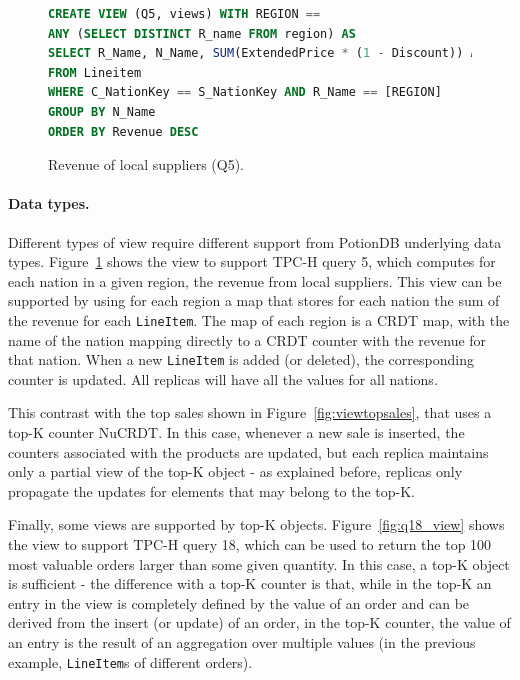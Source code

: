 \documentclass[sigplan,twocolumn,review,anonymous]{acmart}
\begin{document}
\begin{figure}[t]
\small{
\begin{lstlisting}[language=SQL]
CREATE VIEW (Q5, views) WITH REGION == 
ANY (SELECT DISTINCT R_name FROM region) AS
SELECT R_Name, N_Name, SUM(ExtendedPrice * (1 - Discount)) AS Revenue
FROM Lineitem
WHERE C_NationKey == S_NationKey AND R_Name == [REGION]
GROUP BY N_Name
ORDER BY Revenue DESC
\end{lstlisting}}
	\vspace{-5pt}
	\caption{Revenue of local suppliers (Q5).}
	\vspace{-10pt}
	\label{fig:viewlocalsupliers}
\end{figure}


\paragraph{Data types.} Different types of view require different support from PotionDB underlying data types.
Figure~\ref{fig:viewlocalsupliers} shows the view to support TPC-H query 5, which computes
for each nation in a given region, the revenue from local suppliers. 
This view can be supported by using for each region a map that stores for each nation the sum of the 
revenue for each \texttt{LineItem}. The map of each region is a CRDT map, with the name of the nation mapping
directly to a CRDT counter with the revenue for that nation. When a new \texttt{LineItem} is added (or deleted), 
the corresponding counter is updated. All replicas will have all the values for all nations.

This contrast with the top sales shown in Figure~\ref{fig:viewtopsales}, that uses a
top-K counter NuCRDT. In this case, whenever a new sale is inserted, the counters associated with the products are
updated, but each replica maintains only a partial view of the top-K object - as explained before, replicas only propagate 
the updates for elements that may belong to the top-K.

Finally,  some views are supported by top-K objects. Figure~\ref{fig:q18_view} shows the view to 
support TPC-H query 18, which can be used to return the top 100 most valuable orders larger than 
some given quantity.  In this case, a top-K object is sufficient - the difference with a top-K counter is that,
while in the top-K an entry in the view is completely defined by the value of an order and can be derived 
from the insert (or update) of an order, in the top-K counter, the value of an entry is the result of an 
aggregation over multiple values (in the previous example, \texttt{LineItem}s of different orders).
\end{document}
